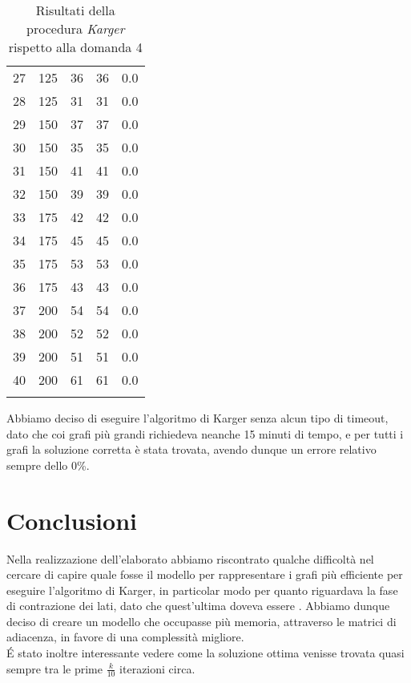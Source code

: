 \begin{center}
\begin{longtable}{|c|c|c|c|c|}
		27 & 125 & 36 & 36 & 0.0 \\
		28 & 125 & 31 & 31 & 0.0 \\
		29 & 150 & 37 & 37 & 0.0 \\
		30 & 150 & 35 & 35 & 0.0 \\
		31 & 150 & 41 & 41 & 0.0 \\
		32 & 150 & 39 & 39 & 0.0 \\
		33 & 175 & 42 & 42 & 0.0 \\
		34 & 175 & 45 & 45 & 0.0 \\
		35 & 175 & 53 & 53 & 0.0 \\
		36 & 175 & 43 & 43 & 0.0 \\
		37 & 200 & 54 & 54 & 0.0 \\
		38 & 200 & 52 & 52 & 0.0 \\
		39 & 200 & 51 & 51 & 0.0 \\
		40 & 200 & 61 & 61 & 0.0 \\
		\hline
		\caption{Risultati della procedura \textit{Karger} rispetto alla domanda 4}
		\label{error-results}
	\end{longtable}
\end{center}\vspace{-40pt}

Abbiamo deciso di eseguire l'algoritmo di Karger senza alcun tipo di timeout, dato che coi grafi più grandi richiedeva neanche 15 minuti di tempo, e per tutti i grafi la soluzione corretta è stata trovata, avendo dunque un errore relativo sempre dello 0\%.

\section{Conclusioni}
Nella realizzazione dell'elaborato abbiamo riscontrato qualche difficoltà nel cercare di capire quale fosse il modello per rappresentare i grafi più efficiente per eseguire l'algoritmo di Karger, in particolar modo per quanto riguardava la fase di contrazione dei lati, dato che quest'ultima doveva essere . Abbiamo dunque deciso di creare un modello che occupasse più memoria, attraverso le matrici di adiacenza, in favore di una complessità migliore.\\
\'E stato inoltre interessante vedere come la soluzione ottima venisse trovata quasi sempre tra le prime $\frac{k}{10}$ iterazioni circa.